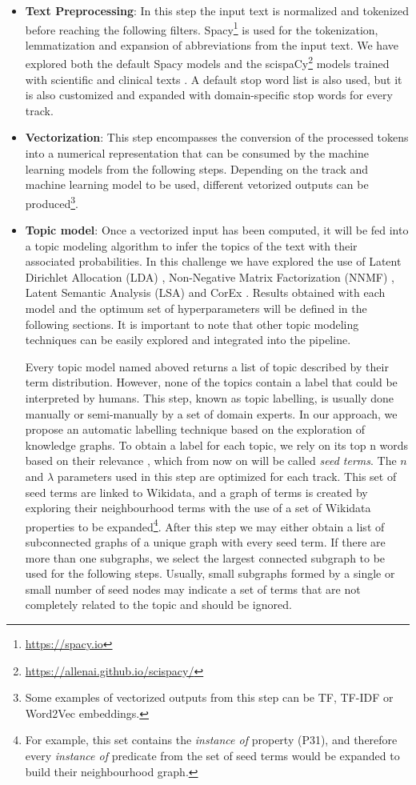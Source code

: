 \documentclass[runningheads]{llncs}
\begin{document}
\begin{itemize}
	\item \textbf{Text Preprocessing}: In this step the input text is normalized and tokenized before reaching the following filters. Spacy\footnote{\url{https://spacy.io}} is used for the tokenization, lemmatization and expansion of abbreviations from the input text. We have explored both the default Spacy models and the scispaCy\footnote{\url{https://allenai.github.io/scispacy/}} models trained with scientific and clinical texts \cite{neumann-etal-2019-scispacy}. A default stop word list is also used, but it is also customized and expanded with domain-specific stop words for every track. 
	\item \textbf{Vectorization}: This step encompasses the conversion of the processed tokens into a numerical representation that can be consumed by the machine learning models from the following steps. Depending on the track and machine learning model to be used, different vetorized outputs can be produced\footnote{Some examples of vectorized outputs from this step can be TF, TF-IDF or Word2Vec embeddings.}.
	\item \textbf{Topic model}: Once a vectorized input has been computed, it will be fed into a topic modeling algorithm to infer the topics of the text with their associated probabilities. In this challenge we have explored the use of Latent Dirichlet Allocation (LDA) \cite{blei2003latent}, Non-Negative Matrix Factorization (NNMF) \cite{xu2003document}, Latent Semantic Analysis (LSA) \cite{deerwester1990indexing} and CorEx \cite{gallagher2017anchored}. Results obtained with each model and the optimum set of hyperparameters will be defined in the following sections. It is important to note that other topic modeling techniques can be easily explored and integrated into the pipeline. 
	
	Every topic model named aboved returns a list of topic described by their term distribution. However, none of the topics contain a label that could be interpreted by humans. This step, known as topic labelling, is usually done manually or semi-manually by a set of domain experts. In our approach, we propose an automatic labelling technique based on the exploration of knowledge graphs. To obtain a label for each topic, we rely on its top n words based on their relevance \cite{sievert2014ldavis}, which from now on will be called \textit{seed terms}. The $n$ and $\lambda$ parameters used in this step are optimized for each track. This set of seed terms are linked to Wikidata, and a graph of terms is created by exploring their neighbourhood terms with the use of a set of Wikidata properties to be expanded\footnote{For example, this set contains the \textit{instance of} property (P31), and therefore every \textit{instance of} predicate from the set of seed terms would be expanded to build their neighbourhood graph.}. After this step we may either obtain a list of subconnected graphs of a unique graph with every seed term. If there are more than one subgraphs, we select the largest connected subgraph to be used for the following steps. Usually, small subgraphs formed by a single or small number of seed nodes may indicate a set of terms that are not completely related to the topic and should be ignored.
	

\end{itemize}
\end{document}
